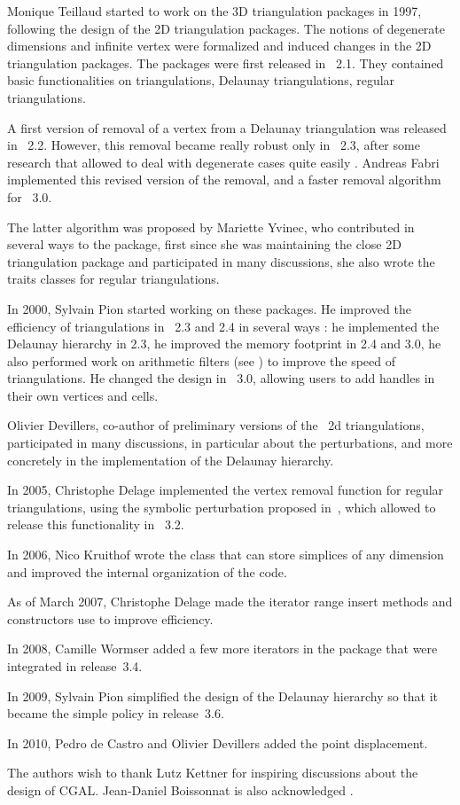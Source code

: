 Monique Teillaud started to work on the 3D triangulation packages in
1997, following the design of the 2D triangulation packages. The
notions of degenerate dimensions and infinite vertex were formalized
\cite{t-tdtc-99} and induced changes in the 2D triangulation
packages. The packages were first released in \cgal\ 2.1. They contained
basic functionalities on triangulations, Delaunay triangulations,
regular triangulations.

A first version of removal of a vertex from a Delaunay triangulation
was released in \cgal\ 2.2. However, this removal became really robust
only in \cgal\ 2.3, after some research that allowed to deal with
degenerate cases quite easily \cite{cgal:dt-pvr3d-03}. Andreas Fabri
implemented this revised version of the removal, and a faster removal
algorithm for \cgal\ 3.0. 

The latter algorithm was proposed by Mariette Yvinec, who contributed
in several ways to the package, first since she was maintaining the
close 2D triangulation package and participated in many discussions,
she also wrote the traits classes for regular triangulations.

In 2000, Sylvain Pion started working on these packages.  He improved
the efficiency of triangulations in \cgal\ 2.3 and 2.4 in several ways
\cite{cgal:bdpty-tc-02}: he implemented the Delaunay hierarchy
\cite{cgal:d-dh-02} in 2.3, he improved the memory footprint in 2.4
and 3.0, he also performed work on arithmetic filters
\cite{cgal:dp-eegpd-03} (see ) to improve
the speed of triangulations.  He changed the design in \cgal\ 3.0,
allowing users to add handles in their own vertices and cells.

Olivier Devillers, co-author of preliminary versions of the \cgal\ 2d
triangulations, participated in many discussions, in particular about
the perturbations, and more concretely in the implementation of the
Delaunay hierarchy. 

In 2005, Christophe Delage implemented the vertex removal function for
regular triangulations, using the symbolic perturbation proposed
in~\cite{cgal:dt-pvrdr-06}, which allowed to release this
functionality in \cgal\ 3.2.

In 2006, Nico Kruithof wrote the  class
that can store simplices of any dimension and improved the internal 
organization of the code.

As of March 2007, Christophe Delage made the iterator range insert methods and
constructors use  to improve efficiency.

In 2008, Camille Wormser added a few more iterators in
the package that were integrated in release~3.4.

In 2009, Sylvain Pion simplified the design of the Delaunay hierarchy
so that it became the simple  policy in release~3.6.

In 2010, Pedro de Castro and Olivier Devillers added the point displacement.

The authors wish to thank Lutz Kettner for inspiring discussions about
the design of CGAL. Jean-Daniel Boissonnat is also acknowledged
\cite{bdty-tcgal-00}.
